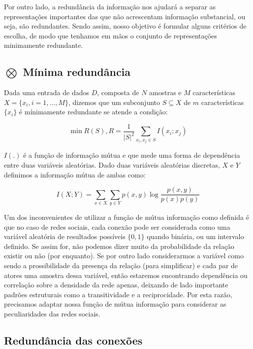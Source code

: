 Por outro lado, a redundância da informação nos ajudará a separar as
representações importantes das que não acrescentam informação substancial, ou
seja, são redundantes. Sendo assim, nosso objetivo é formular alguns critérios
de escolha, de modo que tenhamos em mãos o conjunto de representações
minimamente redundante.

\subsection{$\bigotimes$ Mínima redundância}

Dada uma entrada de dados $D$, composta de $N$ amostras e $M$
características $X=\{x_i, i=1,\ldots,M\}$, dizemos que um subconjunto $S
\subseteq X$ de $m$ características $\{x_i\}$ é mínimamente redundante se atende
a condição:

\begin{equation}
\label{def:min_redun}
\min R(S), R = \frac{1}{|S|^2}\sum_{x_i, x_j \in S}I(x_i;x_j)
\end{equation}

$I(.)$ é a função de informação mútua e que mede uma forma de dependência entre
duas variáveis aleatórias. Dado duas variáveis aleatórias discretas, $X$ e $Y$
definimos a informação mútua de ambas como:

\begin{equation}
\label{def:inf_mutua}
I(X;Y) = \sum_{x\in X}\sum_{y\in Y}p(x,y)\log \frac{p(x,y)}{p(x)p(y)}
\end{equation}

Um dos inconvenientes de utilizar a função de mútua informação como definida é
que no caso de redes sociais, cada conexão pode ser considerada como uma
variável aleatória de resultados possíveis $\{0,1\}$ quando binária, ou um
intervalo definido. Se assim for, não podemos dizer muito da probabilidade da
relação existir ou não (por enquanto). Se por outro lado considerarmos a
variável como sendo a prossibilidade da presença da relação (para simplificar) e
cada par de atores uma amostra dessa variável, então estaremos encontrando
dependência ou correlação sobre a densidade da rede apenas, deixando de lado
importante padrões estruturais como a transitividade e a reciprocidade. Por esta
razão, precisamos adaptar nossa função de mútua informação para considerar as
peculiaridades das redes sociais. 

\subsection{Redundância das conexões}


